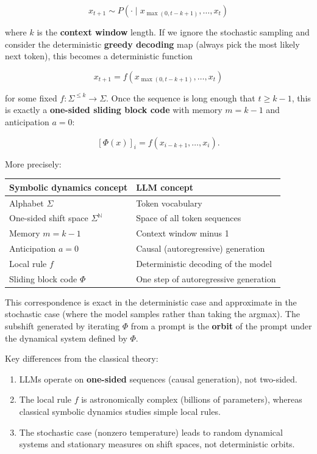 \[
x_{t+1} \sim P(\cdot \mid x_{\max(0, t-k+1)}, \ldots, x_t)
\]

where $k$ is the \textbf{context window} length. If we ignore the stochastic sampling and consider the deterministic \textbf{greedy decoding} map (always pick the most likely next token), this becomes a deterministic function

\[
x_{t+1} = f(x_{\max(0, t-k+1)}, \ldots, x_t)
\]

for some fixed $f: \Sigma^{\leq k} \to \Sigma$. Once the sequence is long enough that $t \geq k - 1$, this is exactly a \textbf{one-sided sliding block code} with memory $m = k - 1$ and anticipation $a = 0$:

\[
[\Phi(x)]_i = f(x_{i-k+1}, \ldots, x_i).
\]

More precisely:

\begin{tabular}{|l|l|}
\hline
Symbolic dynamics concept & LLM concept \\
\hline
Alphabet $\Sigma$ & Token vocabulary \\
One-sided shift space $\Sigma^\mathbb{N}$ & Space of all token sequences \\
Memory $m = k - 1$ & Context window minus 1 \\
Anticipation $a = 0$ & Causal (autoregressive) generation \\
Local rule $f$ & Deterministic decoding of the model \\
Sliding block code $\Phi$ & One step of autoregressive generation \\
\hline
\end{tabular}


This correspondence is exact in the deterministic case and approximate in the stochastic case (where the model samples rather than taking the argmax). The subshift generated by iterating $\Phi$ from a prompt is the \textbf{orbit} of the prompt under the dynamical system defined by $\Phi$.

Key differences from the classical theory:
\begin{enumerate}
  \item LLMs operate on \textbf{one-sided} sequences (causal generation), not two-sided.
  \item The local rule $f$ is astronomically complex (billions of parameters), whereas classical symbolic dynamics studies simple local rules.
  \item The stochastic case (nonzero temperature) leads to random dynamical systems and stationary measures on shift spaces, not deterministic orbits.
\end{enumerate}

